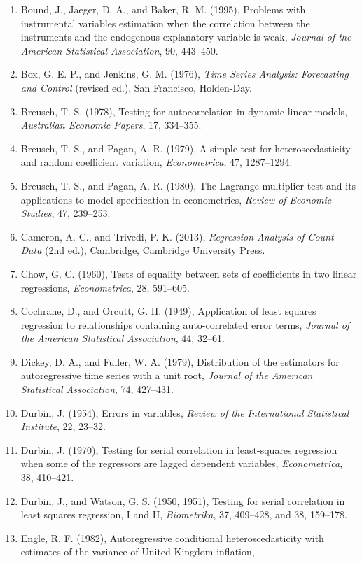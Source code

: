 \documentclass[11pt,a4paper]{article}
\numberwithin{equation}{section}
\theoremstyle{definition}
\begin{document}
\begin{enumerate}
\item Bound, J., Jaeger, D. A., and Baker, R. M. (1995), Problems with instrumental variables estimation when the correlation between the
instruments and the endogenous explanatory variable is weak, \emph{Journal of the American Statistical Association}, 90, 443--450.
\item Box, G. E. P., and Jenkins, G. M. (1976), \emph{Time Series Analysis: Forecasting and Control} (revised ed.), San Francisco, Holden-Day.
\item Breusch, T. S. (1978), Testing for autocorrelation in dynamic linear models, \emph{Australian Economic Papers}, 17, 334--355.
\item Breusch, T. S., and Pagan, A. R. (1979), A simple test for heteroscedasticity and random coefficient variation, \emph{Econometrica}, 47,
1287--1294.
\item Breusch, T. S., and Pagan, A. R. (1980), The Lagrange multiplier test and its applications to model specification in econometrics,
\emph{Review of Economic Studies}, 47, 239--253.
\item Cameron, A. C., and Trivedi, P. K. (2013), \emph{Regression Analysis of Count Data} (2nd ed.), Cambridge, Cambridge University Press.
\item Chow, G. C. (1960), Tests of equality between sets of coefficients in two linear regressions, \emph{Econometrica}, 28, 591--605.
\item Cochrane, D., and Orcutt, G. H. (1949), Application of least squares regression to relationships containing auto-correlated error terms,
\emph{Journal of the American Statistical Association}, 44, 32--61.
\item Dickey, D. A., and Fuller, W. A. (1979), Distribution of the estimators for autoregressive time series with a unit root, \emph{Journal of the
American Statistical Association}, 74, 427--431.
\item Durbin, J. (1954), Errors in variables, \emph{Review of the International Statistical Institute}, 22, 23--32.
\item Durbin, J. (1970), Testing for serial correlation in least-squares regression when some of the regressors are lagged dependent variables,
\emph{Econometrica}, 38, 410--421.
\item Durbin, J., and Watson, G. S. (1950, 1951), Testing for serial correlation in least squares regression, I and II, \emph{Biometrika}, 37,
409--428, and 38, 159--178.
\item Engle, R. F. (1982), Autoregressive conditional heteroscedasticity with estimates of the variance of United Kingdom inflation,

\end{enumerate}
\end{document}
